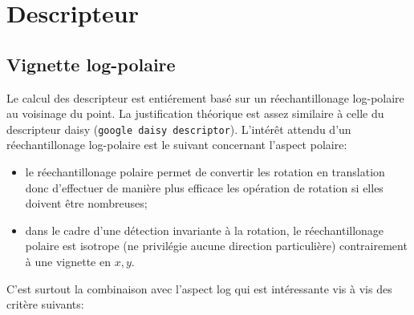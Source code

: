 
\section{Descripteur}


\subsection{Vignette log-polaire}



Le calcul des descripteur est enti\'erement bas\'e sur un r\'eechantillonage log-polaire 
au voisinage du point.  La justification th\'eorique est assez similaire \`a celle du descripteur
daisy ({\tt google daisy descriptor}).  L'int\'er\^et attendu d'un  r\'eechantillonage log-polaire
est le suivant concernant l'aspect polaire:

\begin{itemize}
   \item le  r\'eechantillonage polaire permet de convertir les rotation en translation donc
        d'effectuer de mani\`ere plus efficace les op\'eration de rotation si elles doivent \^etre
        nombreuses;
   \item dans le cadre d'une d\'etection invariante \`a la rotation, le  r\'eechantillonage polaire
        est isotrope (ne privil\'egie aucune direction particuli\`ere) contrairement \`a une vignette en $x,y$.
\end{itemize}

C'est surtout la combinaison avec l'aspect  log qui est int\'eressante vis  \`a vis des crit\`ere suivants:

